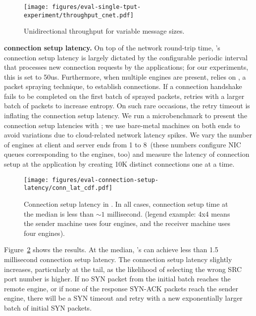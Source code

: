\begin{figure}[t!]
    \centering
    \hspace{-0.7cm}
    \texttt{[image: figures/eval-single-tput-experiment/throughput\_cnet.pdf]}
    \caption{Unidirectional throughput for variable message sizes.}
    \label{fig:eval-micro-tput}
    \vspace{-0.1in}
\end{figure}

\textbf{\rssminus{} connection setup latency.} On top of the network round-trip time, \mt{}'s connection setup latency is largely dictated by the configurable periodic interval that \mt{} processes new connection requests by the applications; for our experiments, this is set to 50us.
Furthermore, when multiple engines are present, \mt{} relies on \rssminus{}, a packet spraying technique, to establish connections. If a connection handshake fails to be completed on the first batch of sprayed packets, \mt{} retries with a larger batch of packets to increase entropy. On such rare occasions, the retry timeout is inflating the connection setup latency.
We run a microbenchmark to present the connection setup latencies with \mt{}; we use bare-metal machines on both ends to avoid variations due to cloud-related network latency spikes.
We vary the number of engines at client and server ends from 1 to 8~(these numbers configure NIC queues corresponding to the engines, too) and measure the latency of connection setup at the application by creating 10K distinct connections one at a time.

\begin{figure}[t!]
    \centering
    \texttt{[image: figures/eval-connection-setup-latency/conn\_lat\_cdf.pdf]}
    \caption{Connection setup latency in \mt{}. In all cases, connection setup time at the median is less than $\sim 1$ millisecond. (legend example: 4x4 means the sender machine uses four engines, and the receiver machine uses four engines).}
    \label{fig:machnet-conn-setup}
    \vspace{-0.1in}
\end{figure}

Figure~\ref{fig:machnet-conn-setup} shows the results. At the median, \mt{}'s \rssminus{} can achieve less than 1.5 millisecond connection setup latency.
The connection setup latency slightly increases, particularly at the tail, as the likelihood of selecting the wrong SRC port number is higher.
If no SYN packet from the initial batch reaches the remote \mt{} engine, or if none of the response SYN-ACK packets reach the \mt{} sender engine, there will be a SYN timeout and retry with a new exponentially larger batch of initial SYN packets.

